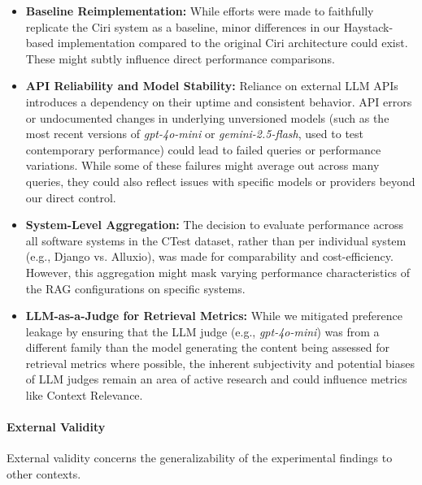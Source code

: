 \begin{itemize}
    \item \textbf{Baseline Reimplementation:} While efforts were made to faithfully replicate the Ciri system as a baseline, minor differences in our Haystack-based implementation compared to the original Ciri architecture could exist. These might subtly influence direct performance comparisons.
    \item \textbf{API Reliability and Model Stability:} Reliance on external LLM APIs introduces a dependency on their uptime and consistent behavior. API errors or undocumented changes in underlying unversioned models (such as the most recent versions of \textit{gpt-4o-mini} or \textit{gemini-2.5-flash}, used to test contemporary performance) could lead to failed queries or performance variations. While some of these failures might average out across many queries, they could also reflect issues with specific models or providers beyond our direct control.
    \item \textbf{System-Level Aggregation:} The decision to evaluate performance across all software systems in the CTest dataset, rather than per individual system (e.g., Django vs. Alluxio), was made for comparability and cost-efficiency. However, this aggregation might mask varying performance characteristics of the RAG configurations on specific systems.
    \item \textbf{LLM-as-a-Judge for Retrieval Metrics:} While we mitigated preference leakage by ensuring that the LLM judge (e.g., \textit{gpt-4o-mini}) was from a different family than the model generating the content being assessed for retrieval metrics where possible, the inherent subjectivity and potential biases of LLM judges remain an area of active research and could influence metrics like Context Relevance.
\end{itemize}

\paragraph{External Validity}
External validity concerns the generalizability of the experimental findings to other contexts.

